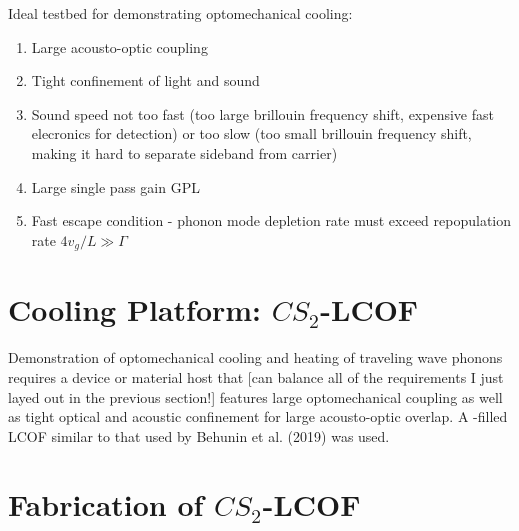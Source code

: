 Ideal testbed for demonstrating optomechanical cooling:

\begin{enumerate}
\item Large acousto-optic coupling
\item Tight confinement of light and sound
\item Sound speed not too fast (too large brillouin frequency shift, expensive fast elecronics for detection) or too slow (too small brillouin frequency shift, making it hard to separate sideband from carrier)
\item Large single pass gain GPL
\item Fast escape condition - phonon mode depletion rate must exceed repopulation rate \(4v_{g}/L \gg \Gamma\)
\end{enumerate}


\section{Cooling Platform: \texorpdfstring{$CS_{2}$}{CS2}-\acl{LCOF}}
\label{sec:Cooling:Platform}

Demonstration of optomechanical cooling and heating of traveling wave phonons requires a device or material host that [can balance all of the requirements I just layed out in the previous section!] features large optomechanical coupling as well as tight optical and acoustic confinement for large acousto-optic overlap. A -filled \ac{LCOF} similar to that used by Behunin et al. (2019) was used.\cite{behunin2019spontaneous}


\section{Fabrication of \texorpdfstring{$CS_{2}$}{CS2}-\acl{LCOF}}
\label{subsec:Cooling:Platform:Fabrication}

